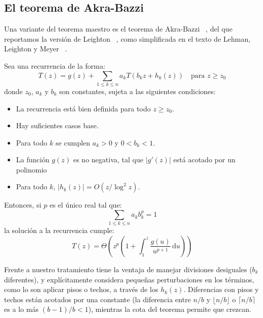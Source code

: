 \subsection{El teorema de Akra-Bazzi}
\label{sec:Akra-Bazzi}

  Una variante del teorema maestro es el teorema de Akra-Bazzi~%
       \cite{akra98:_solution_linear_recurrennce_equations},
  del que reportamos la versión de Leighton~%
    \cite{leighton96:_notes_better_master_theo},
  como simplificada en el texto de Lehman, Leighton y Meyer~%
    \cite{lehman18:_mathem_comput_scien}.
  \begin{theorem}
    \label{theo:Akra-Bazzi}
    Sea una recurrencia de la forma:
    \begin{equation*}
      T(z)
        = g(z) + \sum_{1 \le k \le n} a_k T(b_k z + h_k(z))
           \quad \text{para \(z \ge z_0\)}
    \end{equation*}
    donde \(z_0\), \(a_k\) y \(b_k\) son constantes,
    sujeta a las siguientes condiciones:
    \begin{itemize}
    \item
      La recurrencia está bien definida para todo \(z \ge z_0\).
    \item
      Hay suficientes casos base.
    \item
      Para todo \(k\) se cumplen \(a_k > 0\) y \(0 < b_k < 1\).
    \item
      La función \(g(z)\) es no negativa,
      tal que \(\lvert g'(z) \rvert\) está acotado por un polinomio
    \item
      Para todo \(k\),
      \(\lvert h_k(z) \rvert = O(z/\log^2 z)\).
    \end{itemize}
    Entonces,
    si \(p\) es el único real tal que:
    \begin{equation*}
      \sum_{1 \le k \le n} a_k b_k^p
        = 1
    \end{equation*}
    la solución a la recurrencia cumple:
    \begin{equation*}
      T(z)
        = \Theta
            \left(
              z^p \left(
                     1 + \int_1^z \frac{g(u)}{u^{p + 1}}
                           \, \mathrm{d} u
                  \right)
            \right)
    \end{equation*}
  \end{theorem}
  Frente a nuestro tratamiento tiene la ventaja
  de manejar divisiones desiguales
  (\(b_k\) diferentes),
  y explícitamente
  considera pequeñas perturbaciones en los términos,
  como lo son aplicar pisos o techos,
  a través de los \(h_k(z)\).
  Diferencias con pisos y techos están acotados por una constante
  (la diferencia entre \(n / b\)
   y \(\lfloor n / b \rfloor\) o \(\lceil n / b \rceil\)
   es a lo más \((b - 1) / b < 1\)),
  mientras la cota del teorema permite que crezcan.

